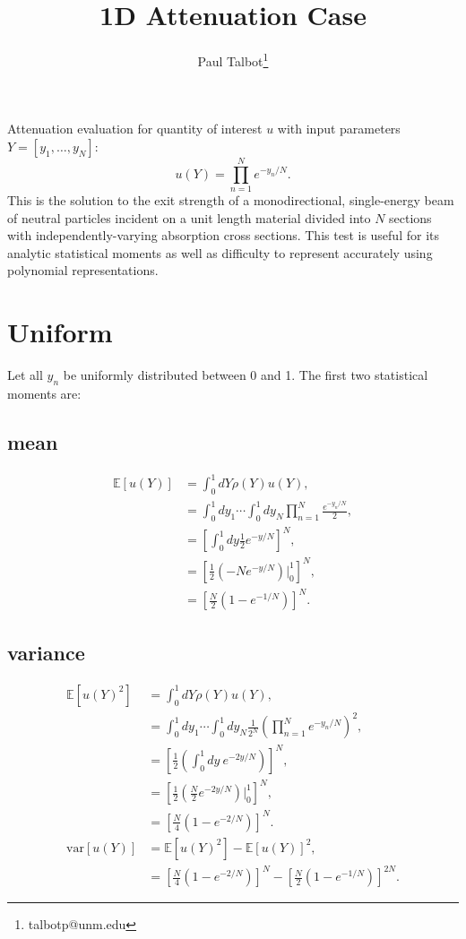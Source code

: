 \documentclass[11pt]{article}
\newcommand{\expv}[1]{\ensuremath{\mathbb{E}[ #1]}}
\begin{document}
\title{1D Attenuation Case}

\author[]{Paul Talbot\thanks{talbotp@unm.edu}}
\date{}
\renewcommand\Authands{ and }
\maketitle

Attenuation evaluation for quantity of interest $u$ with input parameters $Y=[y_1,\ldots,y_N]$:
\begin{equation}
u(Y) = \prod_{n=1}^N e^{-y_n/N}.
\end{equation}
This is the solution to the exit strength of a monodirectional, single-energy beam of neutral particles incident on a unit length material divided into $N$ sections with independently-varying absorption cross sections.  This test is useful for its analytic statistical moments as well as difficulty to represent accurately using polynomial representations.

\section{Uniform}
Let all $y_n$ be uniformly distributed between 0 and 1.  The first two statistical moments are:
\subsection{mean}
\begin{align}
\expv{u(Y)} &=\int_{0}^1 dY \rho(Y)u(Y),\\
  &=\int_{0}^1 dy_1\cdots\int_{0}^1 dy_N \prod_{n=1}^N \frac{e^{-y_n/N}}{2},\\
  &=\left[ \int_{0}^1 dy \frac{1}{2}e^{-y/N}\right]^N,\\
  &=\left[\frac{1}{2}\left(-Ne^{-y/N}\right)\bigg|_0^1\right]^N,\\
  &=\left[\frac{N}{2}\left(1-e^{-1/N}\right)\right]^N.
\end{align}
\subsection{variance}
\begin{align}
\expv{u(Y)^2} &= \int_{0}^1 dY \rho(Y)u(Y),\\
  &=\int_{0}^1 dy_1\cdots\int_{0}^1 dy_N \frac{1}{2^N} \left(\prod_{n=1}^N e^{-y_n/N}\right)^2,\\
  &=\left[\frac{1}{2}\left(\int_{0}^1 dy\ e^{-2y/N} \right)\right]^N,\\
  &=\left[\frac{1}{2}\left(\frac{N}{2}e^{-2y/N} \right)\bigg|_{0}^1 \right]^N,\\
  &=\left[\frac{N}{4}\left(1-e^{-2/N}\right)\right]^N.\\
\text{var}[u(Y)] &= \expv{u(Y)^2}-\expv{u(Y)}^2,\\
  &= \left[\frac{N}{4}\left(1-e^{-2/N}\right)\right]^N - \left[\frac{N}{2}\left(1-e^{-1/N}\right)\right]^{2N}.
\end{align}
\end{document}
